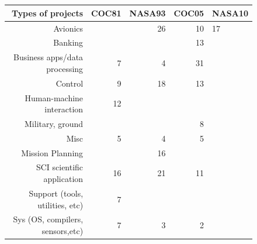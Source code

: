 \documentclass{sig-alternate}
\begin{document}
\begin{figure}[!b]

~\\~\\

\begin{center}
{\scriptsize
\begin{tabular}{r|@{~}r|@{~}r|@{~}r|@{~}l}

Types of projects& COC81 & NASA93& COC05 &NASA10\\\hline 
Avionics&     &26&10&17\\\hline
Banking&       &      &13&     \\\hline
Business apps/data processing&7&4&31&  \\\hline   
Control&9&18&13&     \\\hline
Human-machine interaction&12&       &       &     \\\hline
Military, ground&       &       &8&     \\\hline
Misc&5&4&5&     \\\hline
Mission Planning&      &16&       &     \\\hline
SCI scientific application&16&21&11&     \\\hline
Support (tools, utilities, etc)&7&        &       &   \\\hline  
Sys (OS, compilers, sensors,etc)&7&3&2&     
     

\end{tabular}}


\end{center}
\end{figure}
\end{document}
